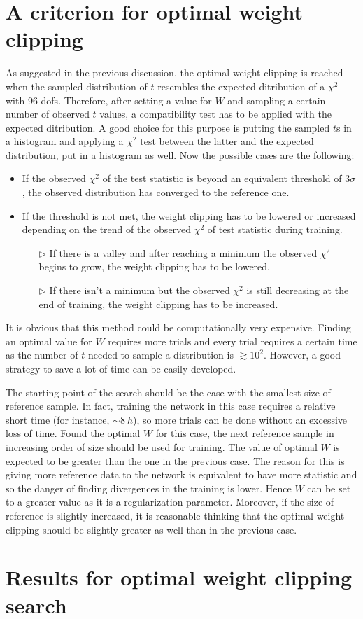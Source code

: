 \section{A criterion for optimal weight clipping}
As suggested in the previous discussion, the optimal weight clipping is reached when the sampled distribution of $t$ resembles the expected ditribution of a $\chi^2$ with 96 dofs. Therefore, after setting a value for $W$ and sampling a certain number of observed $t$ values, a compatibility test has to be applied with the expected ditribution. A good choice for this purpose is putting the sampled $t$s in a histogram and applying a $\chi^2$ test between the latter and the expected distribution, put in a histogram as well. Now the possible cases are the following:
\begin{itemize}
	\item If the observed $\chi^2$ of the test statistic is beyond an equivalent threshold of $3\sigma$, the observed distribution has converged to the reference one.
	\item If the threshold is not met, the weight clipping has to be lowered or increased depending on the trend of the observed $\chi^2$ of test statistic during training.
	\begin{itemize}
		\item[$\triangleright$] If there is a valley and after reaching a minimum the observed $\chi^2$ begins to grow, the weight clipping has to be lowered.
		\item[$\triangleright$] If there isn't a minimum but the observed $\chi^2$ is still decreasing at the end of training, the weight clipping has to be increased.
	\end{itemize}
\end{itemize}

It is obvious that this method could be computationally very expensive. Finding an optimal value for $W$ requires more trials and every trial requires a certain time as the number of $t$ needed to sample a distribution is $\gtrsim 10^2$. However, a good strategy to save a lot of time can be easily developed.

The starting point of the search should be the case with the smallest size of reference sample. In fact, training the network in this case requires a relative short time (for instance, $\sim 8~\si{h}$), so more trials can be done without an excessive loss of time. Found the optimal $W$ for this case, the next reference sample in increasing order of size should be used for training. The value of optimal $W$ is expected to be greater than the one in the previous case. The reason for this is giving more reference data to the network is equivalent to have more statistic and so the danger of finding divergences in the training is lower. Hence $W$ can be set to a greater value as it is a regularization parameter. Moreover, if the size of reference is slightly increased, it is reasonable thinking that the optimal weight clipping should be slightly greater as well than in the previous case.





\section{Results for optimal weight clipping search}
